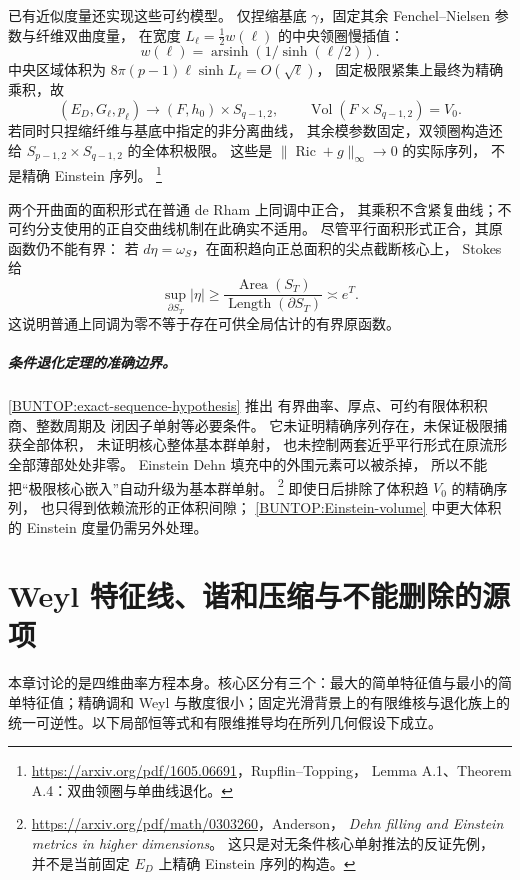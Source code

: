 \documentclass[UTF8,fontset=fandol,zihao=-4,oneside,openany]{ctexbook}
\theoremstyle{cjkplain}
\numberwithin{equation}{chapter}
\begin{document}
已有近似度量还实现这些可约模型。
仅捏缩基底 \(\gamma\)，固定其余 Fenchel--Nielsen 参数与纤维双曲度量，
在宽度 \(L_\ell=\frac12w(\ell)\) 的中央领圈慢插值：
\[
 w(\ell)=\operatorname{arsinh}(1/\sinh(\ell/2)).
\]
中央区域体积为
\(8\pi(p-1)\ell\sinh L_\ell=O(\sqrt\ell)\)，
固定极限紧集上最终为精确乘积，故
\begin{equation}
 (E_D,G_\ell,p_\ell)\longrightarrow
 (F,h_0)\times S_{q-1,2},\qquad
 \operatorname{Vol}(F\times S_{q-1,2})=V_0 .
 \label{BUNTOP:actual-full-volume-limit}
\end{equation}
若同时只捏缩纤维与基底中指定的非分离曲线，
其余模参数固定，双领圈构造还给
\(S_{p-1,2}\times S_{q-1,2}\) 的全体积极限。
这些是 \(\|\operatorname{Ric}+g\|_\infty\to0\) 的实际序列，
不是精确 Einstein 序列。%
\footnote{\url{https://arxiv.org/pdf/1605.06691}，Rupflin--Topping，
Lemma A.1、Theorem A.4：双曲领圈与单曲线退化。}

两个开曲面的面积形式在普通 de Rham 上同调中正合，
其乘积不含紧复曲线；不可约分支使用的正自交曲线机制在此确实不适用。
尽管平行面积形式正合，其原函数仍不能有界：
若 \(d\eta=\omega_S\)，在面积趋向正总面积的尖点截断核心上，
Stokes 给
\[
 \sup_{\partial S_T}|\eta|
 \ge \frac{\operatorname{Area}(S_T)}
          {\operatorname{Length}(\partial S_T)}
 \asymp e^T .
\]
这说明普通上同调为零不等于存在可供全局估计的有界原函数。

\paragraph{条件退化定理的准确边界。}
\eqref{BUNTOP:exact-sequence-hypothesis} 推出
有界曲率、厚点、可约有限体积积商、整数周期及
闭因子单射等必要条件。
它未证明精确序列存在，未保证极限捕获全部体积，
未证明核心整体基本群单射，
也未控制两套近乎平行形式在原流形全部薄部处处非零。
Einstein Dehn 填充中的外围元素可以被杀掉，
所以不能把“极限核心嵌入”自动升级为基本群单射。%
\footnote{\url{https://arxiv.org/pdf/math/0303260}，Anderson，
\emph{Dehn filling and Einstein metrics in higher dimensions}。
这只是对无条件核心单射推法的反证先例，
并不是当前固定 \(E_D\) 上精确 Einstein 序列的构造。}
即使日后排除了体积趋 \(V_0\) 的精确序列，
也只得到依赖流形的正体积间隙；
\eqref{BUNTOP:Einstein-volume} 中更大体积的 Einstein 度量仍需另外处理。


\chapter{Weyl 特征线、谐和压缩与不能删除的源项}\label{WYL:chapter}
本章讨论的是四维曲率方程本身。核心区分有三个：最大的简单特征值与最小的简单特征值；精确调和 Weyl 与散度很小；固定光滑背景上的有限维核与退化族上的统一可逆性。以下局部恒等式和有限维推导均在所列几何假设下成立。
\end{document}
